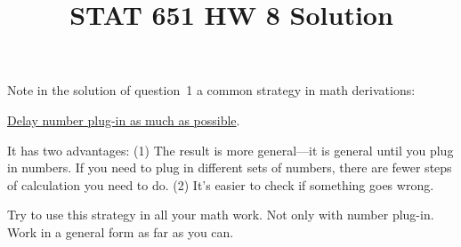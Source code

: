 \documentclass[12pt]{article}
\begin{document}
\title{STAT 651 HW 8 Solution}
\maketitle

Note in the solution of question~1 a common strategy in math derivations:

\underline{Delay number plug-in as much as possible}.

It has two advantages:
(1) The result is more general---it is general until you plug in
numbers. If you need to plug in different sets of numbers,
there are fewer steps of calculation you need to do.
(2) It's easier to check if something goes wrong.

Try to use this strategy in all your math work.
Not only with number plug-in.
Work in a general form as far as you can.
\end{document}
